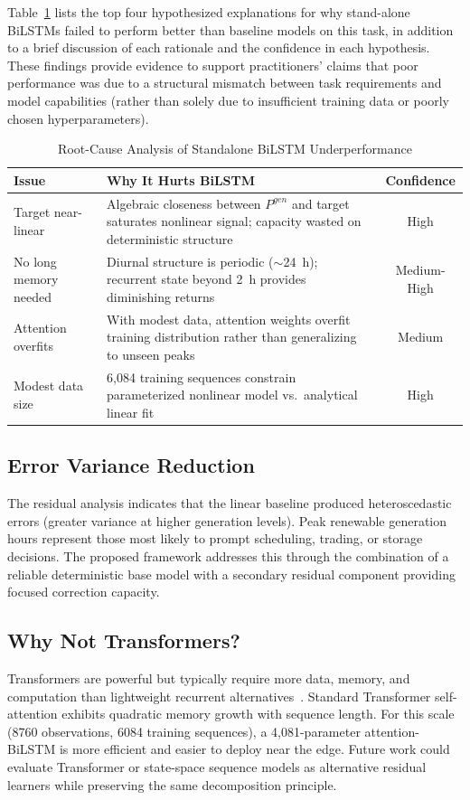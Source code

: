 \documentclass{ieeeaccess}
\begin{document}
Table~\ref{tab:rootcause} lists the top four hypothesized explanations for why stand-alone BiLSTMs failed to perform better than baseline models on this task, in addition to a brief discussion of each rationale and the confidence in each hypothesis. These findings provide evidence to support practitioners' claims that poor performance was due to a structural mismatch between task requirements and model capabilities (rather than solely due to insufficient training data or poorly chosen hyperparameters).
\begin{table}[!t]
\caption{Root-Cause Analysis of Standalone BiLSTM Underperformance}
\label{tab:rootcause}
\centering
\begin{tabular}{p{2cm}p{4.5cm}c}
\toprule
\textbf{Issue} & \textbf{Why It Hurts BiLSTM} & \textbf{Confidence} \\
\midrule
Target near-linear & Algebraic closeness between $P^{gen}$ and target saturates nonlinear signal; capacity wasted on deterministic structure & High \\
\addlinespace
No long memory needed & Diurnal structure is periodic ($\sim$24~h); recurrent state beyond 2~h provides diminishing returns & Medium-High \\
\addlinespace
Attention overfits & With modest data, attention weights overfit training distribution rather than generalizing to unseen peaks & Medium \\
\addlinespace
Modest data size & 6,084 training sequences constrain parameterized nonlinear model vs.\ analytical linear fit & High \\
\bottomrule
\end{tabular}
\end{table}

\subsection{Error Variance Reduction}
The residual analysis indicates that the linear baseline produced heteroscedastic errors (greater variance at higher generation levels). Peak renewable generation hours represent those most likely to prompt scheduling, trading, or storage decisions. The proposed framework addresses this through the combination of a reliable deterministic base model with a secondary residual component providing focused correction capacity.

\subsection{Why Not Transformers?}
Transformers are powerful but typically require more data, memory, and computation than lightweight recurrent alternatives~\cite{vaswani,zhou_informer,wu_autoformer,zhou_fedformer}. Standard Transformer self-attention exhibits quadratic memory growth with sequence length. For this scale (8760 observations, 6084 training sequences), a 4,081-parameter attention-BiLSTM is more efficient and easier to deploy near the edge. Future work could evaluate Transformer or state-space sequence models as alternative residual learners while preserving the same decomposition principle.
\end{document}
